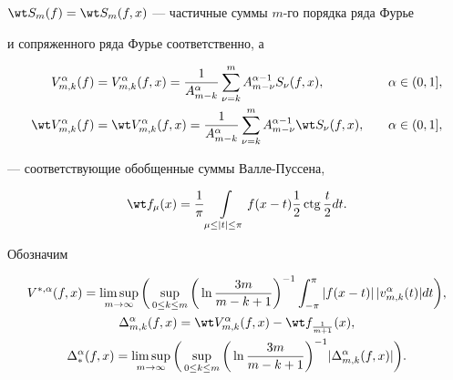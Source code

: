 $\wt S_m(f)=\wt S_m(f,x)$ --- частичные суммы $m$-го порядка ряда Фурье


и сопряженного ряда Фурье соответственно, а


\begin{alignat}{2}


V_{m,k}^{\alpha}(f)&=V_{m,k}^{\alpha}(f,x)


=\frac {1}{A_{m-k}^\alpha}\sum_{\nu=k}^m


A_{m-\nu}^{\alpha-1}S_\nu(f,x),&\quad &\alpha\in(0,1],\\


%


\wt V_{m,k}^{\alpha}(f)&=


\wt V_{m,k}^{\alpha}(f,x)=\frac {1}{A_{m-k}^\alpha}\sum_{\nu=k}^m


A_{m-\nu}^{\alpha-1}\wt S_\nu(f,x),&\quad &\alpha\in(0,1], 


\end{alignat}


--- соответствующие обобщенные суммы Валле-Пуссена,


$$


\wt f_\mu (x)=\frac {1}{\pi} \int\limits_{\mu\le |t|\le \pi} f(x-t)\frac{1}{2}


\ctg {\frac {t}{2}} dt.


$$


Обозначим


\begin{gather*}


V^{*,\alpha}(f,x)


=\limsup_{m\to \infty}\bigg(\sup_{0\le k\le m}


\bigg(\ln\frac{3m}{m-k+1}\bigg)^{-1}


\int_{-\pi}^{\pi}|f(x-t)|\, |v_{m,k}^{\alpha}(t)|dt\bigg), \\


%


\Delta_{m,k}^{\alpha}(f,x)=


\wt V_{m,k}^{\alpha}(f,x)-\wt f_{\frac {1}{m+1}} (x), \\


%


\Delta_{*}^{\alpha}(f,x)=\limsup_{m\to \infty}


\bigg(\sup_{0\le k\le m}\bigg(\ln \frac {3m}{m-k+1}\bigg)^{-1}


|\Delta_{m,k}^{\alpha}(f,x)|\bigg).


\end{gather*}








